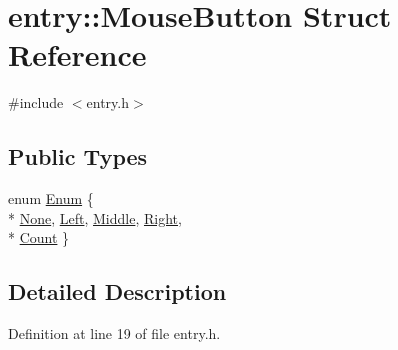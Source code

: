 \hypertarget{structentry_1_1_mouse_button}{\section{entry\+:\+:Mouse\+Button Struct Reference}
\label{structentry_1_1_mouse_button}
}


{\ttfamily \#include $<$entry.\+h$>$}

\subsection*{Public Types}
\begin{DoxyCompactItemize}
\item 
enum \hyperlink{structentry_1_1_mouse_button_a047d99f30fac4b4483eeb96d815fe54e}{Enum} \{ \\*
\hyperlink{structentry_1_1_mouse_button_a047d99f30fac4b4483eeb96d815fe54ea5659849ba94a9ec7624cb080968353b1}{None}, 
\hyperlink{structentry_1_1_mouse_button_a047d99f30fac4b4483eeb96d815fe54ea5fe4dca34d9ea851c1bc9d0f8862db98}{Left}, 
\hyperlink{structentry_1_1_mouse_button_a047d99f30fac4b4483eeb96d815fe54ea00ad90cadbf9b219652fe15d71b3b21c}{Middle}, 
\hyperlink{structentry_1_1_mouse_button_a047d99f30fac4b4483eeb96d815fe54ea7aa2b2b16a1bb9ccd69c78d100a97bcf}{Right}, 
\\*
\hyperlink{structentry_1_1_mouse_button_a047d99f30fac4b4483eeb96d815fe54ea18eab1694a20b6bed0c85d7fde907a1f}{Count}
 \}
\end{DoxyCompactItemize}


\subsection{Detailed Description}


Definition at line 19 of file entry.\+h.



